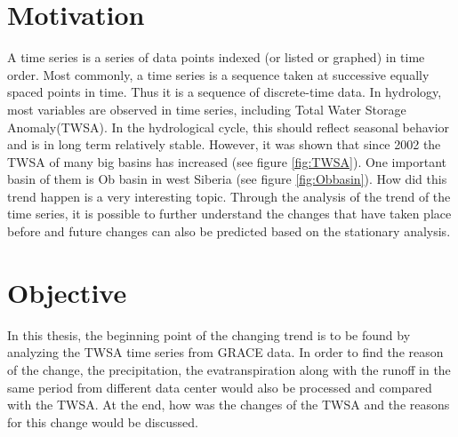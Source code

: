 \section{Motivation}
A time series is a series of data points indexed (or listed or graphed) in time order. Most commonly, a time series is a sequence taken at successive equally spaced points in time. Thus it is a sequence of discrete-time data.  In hydrology, most variables are observed in time series, including Total Water Storage Anomaly(TWSA). In the hydrological cycle, this should reflect seasonal behavior and is in long term relatively stable. However, it was shown that since 2002 the TWSA of many big basins has increased (see figure \ref{fig:TWSA}). One important basin of them is Ob basin in west Siberia (see figure \ref{fig:Obbasin}). How did this trend happen is a very interesting topic. Through the analysis of the trend of the time series, it is possible to further understand the changes that have taken place before and future changes can also be predicted based on the stationary analysis.
\section{Objective}
In this thesis, the beginning point of the changing trend is to be found by analyzing the TWSA time series from GRACE data. In order to find the reason of the change, the precipitation, the evatranspiration along with the runoff in the same period from different data center would also be processed and compared with the TWSA. At the end, how was the changes of the TWSA and the reasons for this change would be discussed. 
